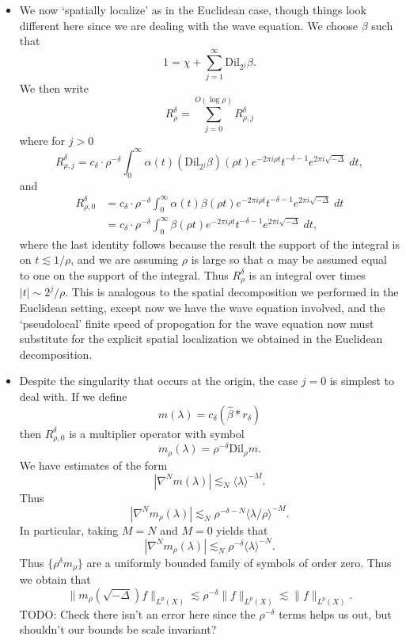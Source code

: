 \begin{itemize}
    \item We now `spatially localize' as in the Euclidean case, though things look different here since we are dealing with the wave equation. We choose $\beta$ such that
    \[ 1 = \chi + \sum_{j = 1}^\infty \text{Dil}_{2^j} \beta. \]
    We then write
    \[ R^\delta_{\rho} = \sum_{j = 0}^{O(\log \rho)} R^\delta_{\rho,j} \]
    where for $j > 0$
    \[ R^\delta_{\rho,j} = c_\delta \cdot \rho^{-\delta} \int_0^\infty \alpha(t) (\text{Dil}_{2^j} \beta)(\rho t) e^{- 2 \pi i \rho t} t^{-\delta - 1} e^{2 \pi i \sqrt{-\Delta}}\; dt, \]
    and
    \begin{align*}
        R^\delta_{\rho,0} &= c_\delta \cdot \rho^{-\delta} \int_0^\infty \alpha(t) \beta(\rho t) e^{-2 \pi i \rho t} t^{-\delta - 1} e^{2 \pi i \sqrt{-\Delta}}\; dt\\
        &= c_\delta \cdot \rho^{-\delta} \int_0^\infty \beta(\rho t) e^{-2 \pi i \rho t} t^{-\delta - 1} e^{2 \pi i \sqrt{-\Delta}}\; dt,
    \end{align*}
    where the last identity follows because the result the support of the integral is on $t \lesssim 1/\rho$, and we are assuming $\rho$ is large so that $\alpha$ may be assumed equal to one on the support of the integral. Thus $R^\delta_\rho$ is an integral over times $|t| \sim 2^j / \rho$. This is analogous to the spatial decomposition we performed in the Euclidean setting, except now we have the wave equation involved, and the `pseudolocal' finite speed of propogation for the wave equation now must substitute for the explicit spatial localization we obtained in the Euclidean decomposition.

    \item Despite the singularity that occurs at the origin, the case $j = 0$ is simplest to deal with. If we define
    \[ m(\lambda) = c_\delta (\widehat{\beta} * r_\delta) \]
    then $R^\delta_{\rho,0}$ is a multiplier operator with symbol
    \[ m_\rho(\lambda) = \rho^{-\delta} \text{Dil}_\rho m. \]
    We have estimates of the form
    \[ | \nabla^N m(\lambda) | \lesssim_N \langle \lambda \rangle^{-M}. \]
    Thus
    \[ | \nabla^N m_\rho(\lambda)| \lesssim_N \rho^{-\delta-N} \langle \lambda / \rho \rangle^{-M}. \]
    In particular, taking $M = N$ and $M = 0$ yields that
    \[ | \nabla^N m_\rho(\lambda)| \lesssim_N \rho^{-\delta} \langle \lambda \rangle^{-N}. \]
    Thus  $\{ \rho^\delta m_\rho \}$ are a uniformly bounded family of symbols of order zero. Thus we obtain that
    \[ \| m_\rho(\sqrt{-\Delta}) f \|_{L^p(X)} \lesssim \rho^{-\delta} \| f \|_{L^p(X)} \lesssim \| f \|_{L^p(X)}. \]
    TODO: Check there isn't an error here since the $\rho^{-\delta}$ terms helps us out, but shouldn't our bounds be scale invariant?


\end{itemize}
